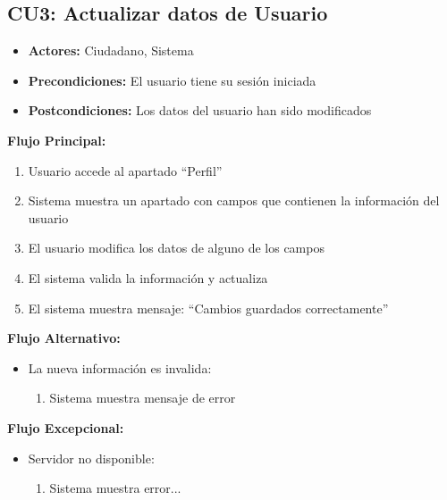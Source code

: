 \begin{multicols}{2}
\subsection*{CU3: Actualizar datos de Usuario}
\begin{itemize}
    \item \textbf{Actores:} Ciudadano, Sistema
    \item \textbf{Precondiciones:} El usuario tiene su sesión iniciada
    \item \textbf{Postcondiciones:} Los datos del usuario han sido modificados
\end{itemize}
\textbf{Flujo Principal:}
\begin{enumerate}
    \item Usuario accede al apartado ``Perfil''
    \item Sistema muestra un apartado con campos que contienen la información del usuario
    \item El usuario modifica los datos de alguno de los campos
    \item El sistema valida la información y actualiza
    \item El sistema muestra mensaje: ``Cambios guardados correctamente''
\end{enumerate}

\textbf{Flujo Alternativo:}
\begin{itemize}
    \item La nueva información es invalida:
    \begin{enumerate}
        \item Sistema muestra mensaje de error
    \end{enumerate}
\end{itemize}

\textbf{Flujo Excepcional:}
\begin{itemize}
    \item Servidor no disponible:
    \begin{enumerate}
        \item Sistema muestra error...
    \end{enumerate}
\end{itemize}


\end{multicols}
